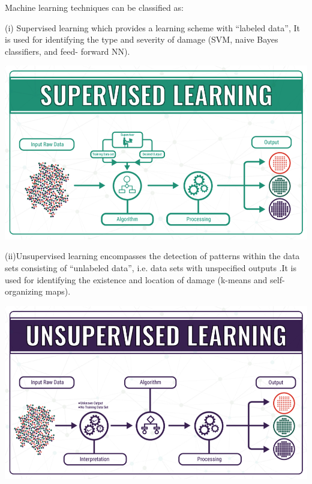 \documentclass{article}
\begin{document}
Machine learning techniques can be classified as:

(i) Supervised learning which provides a learning scheme with “labeled data”, It is used for identifying the type and severity of damage (SVM, naive Bayes classifiers, and feed- forward NN).

\begin{center}
    \includegraphics[scale=0.6]{Images/supervised.png}

\end{center}

(ii)Unsupervised learning encompasses the detection of patterns within the data sets consisting of “unlabeled data”, i.e. data sets with unspecified outputs .It is used for identifying the existence and location of damage (k-means and self-organizing maps).

\begin{center}
    \includegraphics[scale=0.6]{Images/unsupervised.png}

\end{center}
\end{document}
